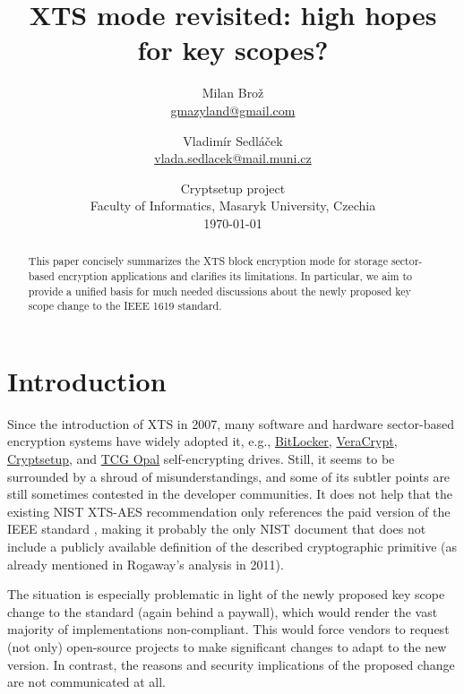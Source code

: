 \documentclass[a4paper]{article}
\title{XTS mode revisited: high hopes for key scopes?}
\author{
Milan Brož\inst{1,2} \\ \normalsize\href{mailto:gmazyland@gmail.com}{gmazyland@gmail.com}
\and
Vladimír Sedláček\inst{2} \\ \normalsize\href{mailto:vlada.sedlacek@mail.muni.cz}{vlada.sedlacek@mail.muni.cz}
}
\date{
\vspace{0.5pt}
\normalsize\inst{1}Cryptsetup project \\
\normalsize\inst{2}Faculty of Informatics, Masaryk University, Czechia \\
\vspace{5pt}
\normalsize\today
}
\begin{document}
\maketitle

\begin{abstract}
This paper concisely summarizes the XTS block encryption mode for storage sector-based encryption applications and clarifies its limitations. In particular, we aim to provide a unified basis for much needed discussions about the newly proposed key scope change to the IEEE 1619 standard.
\end{abstract}

\begin{center}
\doclicenseText
\end{center}

\section{Introduction}

Since the introduction of XTS \cite{IEEE1619-2018} in 2007, many software and hardware sector-based encryption systems have widely adopted it, e.g., \href{https://learn.microsoft.com/en-us/windows/security/operating-system-security/data-protection/bitlocker/}{BitLocker}, \href{https://veracrypt.fr}{VeraCrypt}, \href{https://gitlab.com/cryptsetup/cryptsetup}{Cryptsetup},
and \href{https://trustedcomputinggroup.org/resource/storage-work-group-storage-security-subsystem-class-opal/}{TCG Opal} self-encrypting drives. Still, it seems to be surrounded by a shroud of misunderstandings, and some of its subtler points are still sometimes contested in the developer communities. It does not help that the existing NIST XTS-AES recommendation \cite{nistxts} only references the paid version of the IEEE standard \cite{IEEE1619-2018}, making it probably the only NIST document that does not include a publicly available definition of the described cryptographic primitive (as already mentioned in Rogaway's analysis \cite{rogaway2011evaluation} in 2011).

The situation is especially problematic in light of the newly proposed key scope change to the standard \cite{IEEE1619-draft} (again behind a paywall), which would render the vast majority of implementations non-compliant. This would force vendors to request (not only) open-source projects to make significant changes to adapt to the new version. In contrast, the reasons and security implications of the proposed change are not communicated at all. 
\end{document}

